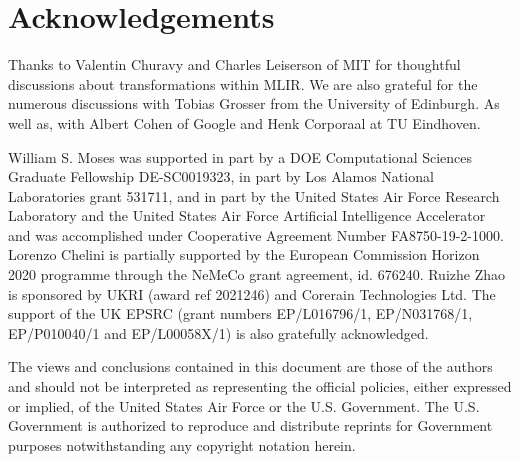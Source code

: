 \section*{Acknowledgements}

Thanks to Valentin Churavy and Charles Leiserson of MIT for thoughtful discussions about transformations within MLIR. We
are also grateful for the numerous discussions with Tobias Grosser
from the University of Edinburgh. As well as, with Albert Cohen of Google and Henk Corporaal at TU Eindhoven.

William S. Moses was supported in part by a DOE Computational Sciences Graduate Fellowship DE-SC0019323, in part by Los Alamos National Laboratories grant 531711, and in part by the United States Air Force Research Laboratory and the United States Air Force Artificial Intelligence Accelerator and was accomplished under Cooperative Agreement Number FA8750-19-2-1000. Lorenzo Chelini is partially supported by the European Commission Horizon 2020 programme through the NeMeCo grant agreement, id. 676240. Ruizhe Zhao is sponsored by UKRI (award ref 2021246) and Corerain Technologies Ltd. The support of the UK EPSRC (grant numbers EP/L016796/1, EP/N031768/1, EP/P010040/1 and EP/L00058X/1) is also gratefully acknowledged.

The views and conclusions contained in this document are those of the authors and should not be interpreted as representing the official policies, either expressed or implied, of the United States Air Force or the U.S. Government. The U.S. Government is authorized to reproduce and distribute reprints for Government purposes notwithstanding any copyright notation herein.